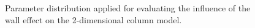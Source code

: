 \documentclass{article}
\begin{document}
\begin{figure}[p]
{}
\caption{Parameter distribution applied for evaluating the influence of the wall effect on the 2-dimensional column model.}
\label{fig:porosity_wall}
\end{figure}

\begin{figure}[p]
\centering
 \\ \subfloat{
}
\end{figure}
\end{document}
